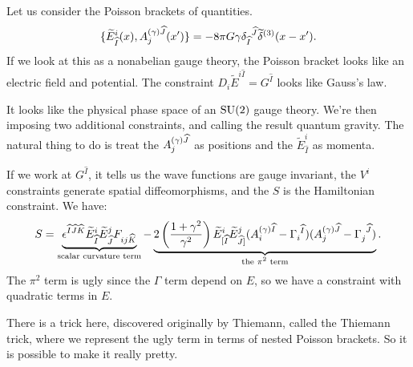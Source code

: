 Let us consider the Poisson brackets of quantities.
\begin{equation}
\{\widetilde{E}^{i}_{\widehat{I}}(x),A^{(\gamma)\widehat{J}}_{j}(x')\}
= -8\pi G\gamma{\delta_{\widehat{I}}}^{\widehat{J}}\widetilde{\delta}^{(3)}(x-x').
\end{equation}
If we look at this as a nonabelian gauge theory, the Poisson bracket
looks like an electric field and potential. The constraint
$D_{i}\widetilde{E}^{i\widehat{I}}=G^{\widehat{I}}$ looks like Gauss's
law.

It looks like the physical phase space of an $\operatorname{SU}(2)$ gauge theory.
We're then imposing two additional constraints, and calling the result
quantum gravity. The natural thing to do is treat the
$A^{(\gamma)\widehat{J}}_{j}$ as positions and
the $\widetilde{E}^{i}_{\widehat{I}}$ as momenta.

If we work at $G^{\widehat{I}}$, it tells us the wave functions are
gauge invariant, the $V^{i}$ constraints generate spatial
diffeomorphisms, and the $S$ is the Hamiltonian constraint. We have:
  \begin{equation}
S = \underbrace{\epsilon^{\widehat{I}\widehat{J}\widehat{K}}\widetilde{E}^{i}_{\widehat{I}}\widetilde{E}^{j}_{\widehat{J}}F_{ij\widehat{K}}}_{\text{scalar curvature term}}
    -\underbrace{2\left(\frac{1+\gamma^{2}}{\gamma^{2}}\right)\widetilde{E}^{i}_{[\widehat{I}}\widetilde{E}^{j}_{\widehat{J}]}(A^{(\gamma)\widehat{I}}_{i}-\Gamma_{i}^{\phantom{i}\widehat{I}})
(A^{(\gamma)\widehat{J}}_{j}-\Gamma_{j}^{\phantom{j}\widehat{J}})}_{\text{the $\pi^{2}$ term}}.
  \end{equation}
The $\pi^{2}$ term is ugly since the $\Gamma$ term depend on $E$, so we
have a constraint with quadratic terms in $E$.

There is a trick here, discovered originally by Thiemann, called the
Thiemann trick, where we represent the ugly term
in terms of nested Poisson brackets. So it is possible to make it really
pretty.

